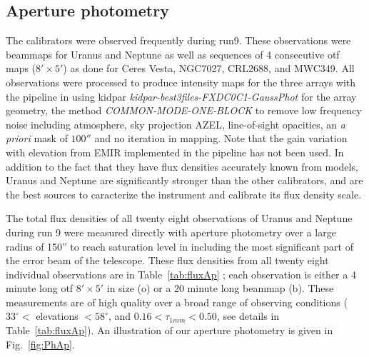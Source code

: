 \subsection{Aperture photometry}

The calibrators were observed frequently during run9. These observations were beammaps for Uranus and Neptune
as well as  sequences of 4 consecutive
otf maps ($8' \times 5'$) as done for Ceres Vesta, NGC7027, CRL2688, and MWC349. All observations were processed 
to produce intensity maps for the three arrays with the pipeline  in
using kidpar
{\it kidpar-best3files-FXDC0C1-GaussPhot} for the array geometry,
the method {\it COMMON-MODE-ONE-BLOCK}  to remove
 low frequency noise including atmosphere,
sky projection AZEL, line-of-sight opacities, an {\it a priori} mask of $100''$ and no iteration in mapping.
Note that the gain variation with elevation from EMIR implemented in the pipeline has not been used. 
In addition to the fact that they  have flux densities accurately known from models,
Uranus and Neptune are significantly stronger than the other calibrators, and  are the best sources to caracterize the
instrument and calibrate its flux density  scale.

The total flux densities of all twenty eight observations of Uranus and Neptune during run 9 were
measured directly with aperture photometry over a large radius of 150'' to reach saturation level in including the most significant part of the
error beam of the telescope. These flux densities from all twenty eight individual observations are in Table~\ref{tab:fluxAp} ; each observation
is either a 4 minute long  otf $8' \times 5'$ in size (o) or  a 20 minute long beammap (b). These measurements are of high quality
over a broad range of observing conditions
($33^{\circ}<$ elevations $<58^{\circ}$, and   $0.16 < \tau_{1mm} < 0.50$, see details in  Table~\ref{tab:fluxAp}). An illustration of
our aperture photometry is given in Fig.~\ref{fig:PhAp}.

